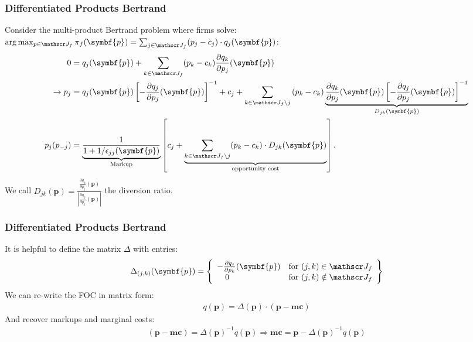 \documentclass[aspectratio=169,11pt]{beamer}
\begin{document}
\begin{frame}
\frametitle{Differentiated Products Bertrand}
\small
Consider the multi-product Bertrand problem where firms solve: $\arg \max_{p \in \calJ_f} \pi_f (\symbf{p}) = \sum_{j \in \calJ_f} (p_j - c_j) \cdot q_j(\symbf{p})$:
\begin{align*}
 0&= q_j(\symbf{p}) + \sum_{k \in \calJ_f} (p_k - c_k) \frac{\partial q_{k}}{\partial p_j}(\symbf{p}) \\
\rightarrow p_j &=q_{j}(\symbf{p}) \left[-\frac{\partial q_{j}}{\partial p_{j}}(\symbf{p})\right]^{-1} + c_{j} + \sum_{k \in \calJ_{f} \setminus j} \left(p_{k}-c_{k}\right) \underbrace{\frac{\partial q_{k}}{\partial p_{j}}(\symbf{p})\left[-\frac{\partial q_{j}}{\partial p_{j}}(\symbf{p})\right]^{-1}}_{D_{jk}(\symbf{p})}\\
p_j(p_{-j}) &= \underbrace{\frac{1}{1+1/\epsilon_{jj}(\symbf{p})}}_{\text{Markup}} \left[c_j + \underbrace{\sum_{k \in \calJ_{f} \setminus j}  (p_k-c_k) \cdot  D_{jk} (\symbf{p}) }_{\text{opportunity cost}}\right].
\end{align*}
We call $D_{jk}(\symbf{p}) = \frac{\frac{\partial q_{k}}{\partial p_j}(\symbf{p})}{\left| \frac{\partial q_{j}}{\partial p_j}(\symbf{p}) \right|}$ the \alert{diversion ratio}.
\end{frame}


\begin{frame}
\frametitle{Differentiated Products Bertrand}
It is helpful to define the matrix $\Delta$ with entries:
\begin{eqnarray*}
\Delta_{(j,k)}(\symbf{p}) = \left\{\begin{array}{lr}
         - \frac{\partial q_{j}}{\partial p_k}(\symbf{p}) & \text{for }  (j,k) \in \calJ_f\\
       	  \quad 0 & \text{for } (j,k) \notin \calJ_f
        \end{array} \right\}
\end{eqnarray*}
We can re-write the FOC in matrix form:
\begin{eqnarray*}
q(\symbf{p}) = \Delta(\symbf{p})\cdot(\symbf{p}-\symbf{mc})
\end{eqnarray*}
\pause
And recover markups and marginal costs:
\begin{eqnarray*}
(\symbf{p}-\symbf{mc}) =  \Delta(\symbf{p})^{-1} q(\symbf{p})  \Rightarrow \symbf{mc}= \symbf{p} - \Delta(\symbf{p})^{-1} q(\symbf{p})
\end{eqnarray*}
\end{frame}
\end{document}
